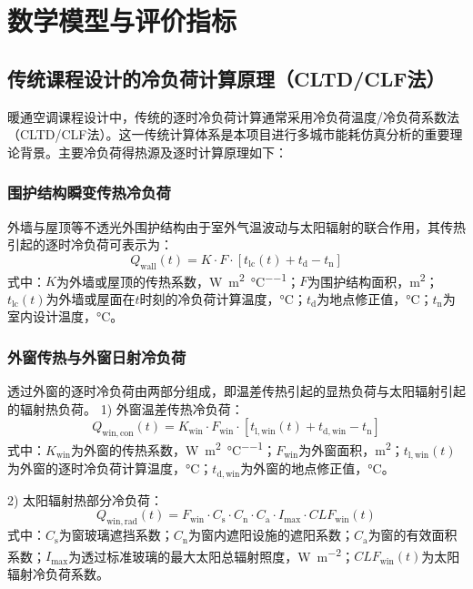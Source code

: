 \section{数学模型与评价指标}

\subsection{传统课程设计的冷负荷计算原理（CLTD/CLF法）}

暖通空调课程设计中，传统的逐时冷负荷计算通常采用冷负荷温度/冷负荷系数法（CLTD/CLF法）。这一传统计算体系是本项目进行多城市能耗仿真分析的重要理论背景。主要冷负荷得热源及逐时计算原理如下：

\subsubsection{围护结构瞬变传热冷负荷}
外墙与屋顶等不透光外围护结构由于室外气温波动与太阳辐射的联合作用，其传热引起的逐时冷负荷可表示为：
\begin{equation}
Q_{\mathrm{wall}}(t) = K \cdot F \cdot \left[ t_{\mathrm{lc}}(t) + t_{\mathrm{d}} - t_{\mathrm{n}} \right]
\end{equation}
式中：$K$为外墙或屋顶的传热系数，\si{W\per\square\meter\per\degreeCelsius}；$F$为围护结构面积，\si{\square\meter}；$t_{\mathrm{lc}}(t)$为外墙或屋面在$t$时刻的冷负荷计算温度，\si{\degreeCelsius}；$t_{\mathrm{d}}$为地点修正值，\si{\degreeCelsius}；$t_{\mathrm{n}}$为室内设计温度，\si{\degreeCelsius}。

\subsubsection{外窗传热与外窗日射冷负荷}
透过外窗的逐时冷负荷由两部分组成，即温差传热引起的显热负荷与太阳辐射引起的辐射热负荷。
1) 外窗温差传热冷负荷：
\begin{equation}
Q_{\mathrm{win,con}}(t) = K_{\mathrm{win}} \cdot F_{\mathrm{win}} \cdot \left[ t_{\mathrm{l,win}}(t) + t_{\mathrm{d,win}} - t_{\mathrm{n}} \right]
\end{equation}
式中：$K_{\mathrm{win}}$为外窗的传热系数，\si{W\per\square\meter\per\degreeCelsius}；$F_{\mathrm{win}}$为外窗面积，\si{\square\meter}；$t_{\mathrm{l,win}}(t)$为外窗的逐时冷负荷计算温度，\si{\degreeCelsius}；$t_{\mathrm{d,win}}$为外窗的地点修正值，\si{\degreeCelsius}。

2) 太阳辐射热部分冷负荷：
\begin{equation}
Q_{\mathrm{win,rad}}(t) = F_{\mathrm{win}} \cdot C_{\mathrm{s}} \cdot C_{\mathrm{n}} \cdot C_{\mathrm{a}} \cdot I_{\mathrm{max}} \cdot CLF_{\mathrm{win}}(t)
\end{equation}
式中：$C_{\mathrm{s}}$为窗玻璃遮挡系数；$C_{\mathrm{n}}$为窗内遮阳设施的遮阳系数；$C_{\mathrm{a}}$为窗的有效面积系数；$I_{\mathrm{max}}$为透过标准玻璃的最大太阳总辐射照度，\si{W\per\square\meter}；$CLF_{\mathrm{win}}(t)$为太阳辐射冷负荷系数。

